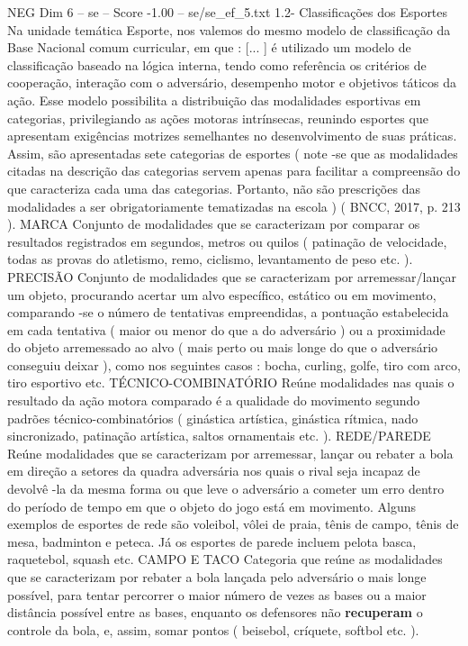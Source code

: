 \begin{textsample}{NEG Dim 6 – se – Score -1.00 – se/se\_ef\_5.txt}  \label{ex:f6_neg_242}
1.2- Classificações dos Esportes Na unidade temática Esporte, nos valemos do mesmo modelo de classificação da Base Nacional comum curricular, em que : [... ] é utilizado um modelo de classificação baseado na lógica interna, tendo como referência os critérios de cooperação, interação com o adversário, desempenho motor e objetivos táticos da ação.
Esse modelo possibilita a distribuição das modalidades esportivas em categorias, privilegiando as ações motoras intrínsecas, reunindo esportes que apresentam exigências motrizes semelhantes no desenvolvimento de suas práticas.
Assim, são apresentadas sete categorias de esportes ( note -se que as modalidades citadas na descrição das categorias servem apenas para facilitar a compreensão do que caracteriza cada uma das categorias.
Portanto, não são prescrições das modalidades a ser obrigatoriamente tematizadas na escola ) ( BNCC, 2017, p. 213 ).
MARCA Conjunto de modalidades que se caracterizam por comparar os resultados registrados em segundos, metros ou quilos ( patinação de velocidade, todas as provas do atletismo, remo, ciclismo, levantamento de peso etc. ).
PRECISÃO Conjunto de modalidades que se caracterizam por arremessar/lançar um objeto, procurando acertar um alvo específico, estático ou em movimento, comparando -se o número de tentativas empreendidas, a pontuação estabelecida em cada tentativa ( maior ou menor do que a do adversário ) ou a proximidade do objeto arremessado ao alvo ( mais perto ou mais longe do que o adversário conseguiu deixar ), como nos seguintes casos : bocha, curling, golfe, tiro com arco, tiro esportivo etc.
TÉCNICO-COMBINATÓRIO Reúne modalidades nas quais o resultado da ação motora comparado é a qualidade do movimento segundo padrões técnico-combinatórios ( ginástica artística, ginástica rítmica, nado sincronizado, patinação artística, saltos ornamentais etc. ).
REDE/PAREDE Reúne modalidades que se caracterizam por arremessar, lançar ou rebater a bola em direção a setores da quadra adversária nos quais o rival seja incapaz de devolvê -la da mesma forma ou que leve o adversário a cometer um erro dentro do período de tempo em que o objeto do jogo está em movimento.
Alguns exemplos de esportes de rede são voleibol, vôlei de praia, tênis de campo, tênis de mesa, badminton e peteca.
Já os esportes de parede incluem pelota basca, raquetebol, squash etc.
CAMPO E TACO Categoria que reúne as modalidades que se caracterizam por rebater a bola lançada pelo adversário o mais longe possível, para tentar percorrer o maior número de vezes as bases ou a maior distância possível entre as bases, enquanto os defensores não \textbf{recuperam} o controle da bola, e, assim, somar pontos ( beisebol, críquete, softbol etc. ).

\end{textsample}
